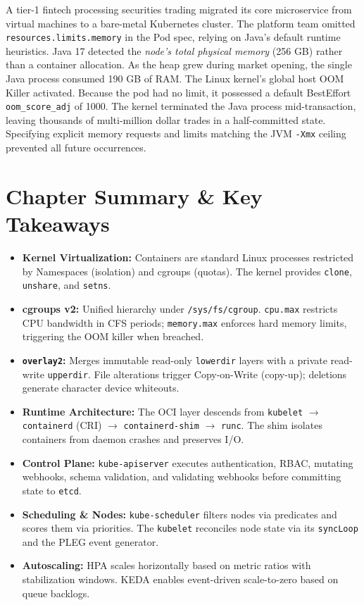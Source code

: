 \begin{realworldbox}
A tier-1 fintech processing securities trading migrated its core microservice from virtual machines to a bare-metal Kubernetes cluster. The platform team omitted \texttt{resources.limits.memory} in the Pod spec, relying on Java's default runtime heuristics. Java 17 detected the \emph{node's total physical memory} (256 GB) rather than a container allocation. As the heap grew during market opening, the single Java process consumed 190 GB of RAM. The Linux kernel's global host OOM Killer activated. Because the pod had no limit, it possessed a default BestEffort \texttt{oom\_score\_adj} of 1000. The kernel terminated the Java process mid-transaction, leaving thousands of multi-million dollar trades in a half-committed state. Specifying explicit memory requests and limits matching the JVM \texttt{-Xmx} ceiling prevented all future occurrences.
\end{realworldbox}

\section{Chapter Summary \& Key Takeaways}
\begin{itemize}[leftmargin=15pt]
  \item \textbf{Kernel Virtualization:} Containers are standard Linux processes restricted by Namespaces (isolation) and cgroups (quotas). The kernel provides \texttt{clone}, \texttt{unshare}, and \texttt{setns}.
  \item \textbf{cgroups v2:} Unified hierarchy under \texttt{/sys/fs/cgroup}. \texttt{cpu.max} restricts CPU bandwidth in CFS periods; \texttt{memory.max} enforces hard memory limits, triggering the OOM killer when breached.
  \item \textbf{\texttt{overlay2}:} Merges immutable read-only \texttt{lowerdir} layers with a private read-write \texttt{upperdir}. File alterations trigger Copy-on-Write (copy-up); deletions generate character device whiteouts.
  \item \textbf{Runtime Architecture:} The OCI layer descends from \texttt{kubelet} $\to$ \texttt{containerd} (CRI) $\to$ \texttt{containerd-shim} $\to$ \texttt{runc}. The shim isolates containers from daemon crashes and preserves I/O.
  \item \textbf{Control Plane:} \texttt{kube-apiserver} executes authentication, RBAC, mutating webhooks, schema validation, and validating webhooks before committing state to \texttt{etcd}.
  \item \textbf{Scheduling \& Nodes:} \texttt{kube-scheduler} filters nodes via predicates and scores them via priorities. The \texttt{kubelet} reconciles node state via its \texttt{syncLoop} and the PLEG event generator.
  \item \textbf{Autoscaling:} HPA scales horizontally based on metric ratios with stabilization windows. KEDA enables event-driven scale-to-zero based on queue backlogs.
\end{itemize}

